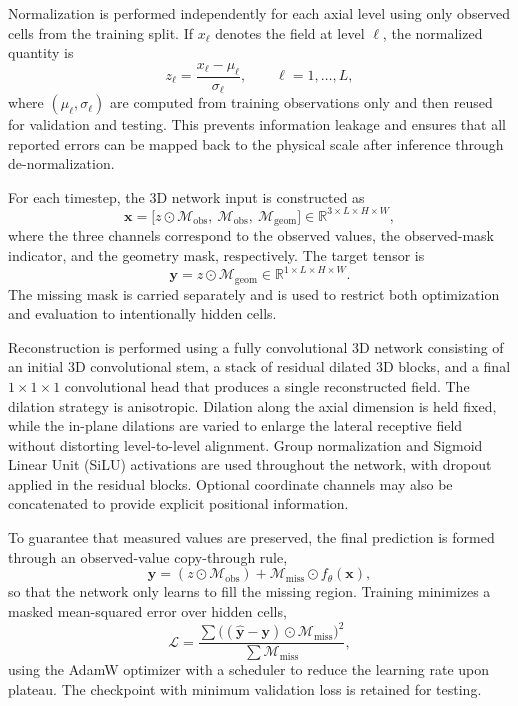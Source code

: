 \documentclass[review]{elsarticle}
\theoremstyle{definition}
\theoremstyle{definition}
\theoremstyle{remark}
\begin{document}
Normalization is performed independently for each axial level using only observed cells from the training split. If $x_\ell$ denotes the field at level $\ell$, the normalized quantity is
\[
z_\ell=\frac{x_\ell-\mu_\ell}{\sigma_\ell}, \qquad \ell=1,\dots,L,
\]
where $(\mu_\ell,\sigma_\ell)$ are computed from training observations only and then reused for validation and testing. This prevents information leakage and ensures that all reported errors can be mapped back to the physical scale after inference through de-normalization.

For each timestep, the 3D network input is constructed as
\[
\mathbf{x}=\big[z\odot\mathcal{M}_{\mathrm{obs}},\ \mathcal{M}_{\mathrm{obs}},\ \mathcal{M}_{\mathrm{geom}}\big]
\in \mathbb{R}^{3\times L\times H\times W},
\]
where the three channels correspond to the observed values, the observed-mask indicator, and the geometry mask, respectively. The target tensor is
\[
\mathbf{y}=z\odot\mathcal{M}_{\mathrm{geom}}
\in \mathbb{R}^{1\times L\times H\times W}.
\]
The missing mask is carried separately and is used to restrict both optimization and evaluation to intentionally hidden cells.

Reconstruction is performed using a fully convolutional 3D network consisting of an initial 3D convolutional stem, a stack of residual dilated 3D blocks, and a final $1\times1\times1$ convolutional head that produces a single reconstructed field. The dilation strategy is anisotropic. Dilation along the axial dimension is held fixed, while the in-plane dilations are varied to enlarge the lateral receptive field without distorting level-to-level alignment. Group normalization and Sigmoid Linear Unit (SiLU) activations are used throughout the network, with dropout applied in the residual blocks. Optional coordinate channels may also be concatenated to provide explicit positional information.

To guarantee that measured values are preserved, the final prediction is formed through an observed-value copy-through rule,
\[
\hat{\mathbf{y}}=(z\odot\mathcal{M}_{\mathrm{obs}})+\mathcal{M}_{\mathrm{miss}}\odot f_\theta(\mathbf{x}),
\]
so that the network only learns to fill the missing region. Training minimizes a masked mean-squared error over hidden cells,
\[
\mathcal{L}=
\frac{\sum \big((\hat{\mathbf{y}}-\mathbf{y})\odot\mathcal{M}_{\mathrm{miss}}\big)^2}
{\sum \mathcal{M}_{\mathrm{miss}}},
\]
using the AdamW optimizer with a scheduler to reduce the learning rate upon plateau. The checkpoint with minimum validation loss is retained for testing.
\end{document}
